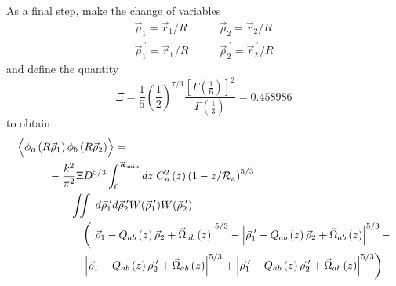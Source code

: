 As a final step, make the change of variables
\begin{equation}
\begin{aligned}
\vec{\rho}_{1} = \vec{r}_{1}/R \quad & \quad \vec{\rho}_{2} = \vec{r}_{2}/R \\
\vec{\rho}^{\;\prime}_{1} = \vec{r}^{\;\prime}_{1}/R \quad & \quad \vec{\rho}^{\;\prime}_{2} = \vec{r}^{\;\prime}_{2}/R
\end{aligned}
\end{equation}
and define the quantity 
\begin{equation}\label{eqn:Xi}
\Xi = \frac{1}{5}\left(\frac{1}{2}\right)^{7/3} \frac{\left[\Gamma\left(\frac{1}{6}\right)\right]^{2}}{\Gamma\left(\frac{1}{3}\right)} = 0.458986
\end{equation}
to obtain
\begin{equation}\label{eqn:prphase_n7}
\begin{aligned}
&\left\langle \vphantom{\hat{\phi}_{a}} \phi_{a}\left(R\vec{\rho}_{1}\right) \phi_{b}\left(R\vec{\rho}_{2}\right)\right\rangle = \\ 
&\quad\quad\quad
 -\frac{k^{2}}{\pi^{2}} \Xi D^{5/3}
\int_{0}^{\mathcal{R}_{\rm min}} dz\;C_{n}^{2}\left(z\right) \left(1 - z/\mathcal{R}_{\rm a}\right)^{5/3}\\
& \quad\quad\quad\quad\quad
\iint \; d\vec{\rho}^{\;\prime}_{1}d\vec{\rho}^{\;\prime}_{2}  
W(\vec{\rho}^{\;\prime}_{1}) W(\vec{\rho}^{\;\prime}_{2}) \\
& \quad\quad\quad\quad\quad\quad
\left(\left\vert \vec{\rho}_{1}  - Q_{ab}\left(z\right)\vec{\rho}_{2} + \vec{\Omega}_{ab}\left(z\right)\right\vert^{5/3} -
\left\vert \vec{\rho}^{\;\prime}_{1}  - Q_{ab}\left(z\right)\vec{\rho}_{2} + \vec{\Omega}_{ab}\left(z\right)\right\vert^{5/3} -
\right. \\
& \quad\quad\quad\quad\quad\quad
\left.
\left\vert \vec{\rho}_{1}  - Q_{ab}\left(z\right)\vec{\rho}^{\;\prime}_{2} + \vec{\Omega}_{ab}\left(z\right)\right\vert^{5/3} + 
\left\vert \vec{\rho}^{\;\prime}_{1}  - Q_{ab}\left(z\right)\vec{\rho}^{\;\prime}_{2} + \vec{\Omega}_{ab}\left(z\right)\right\vert^{5/3}\right)
\end{aligned}
\end{equation}

